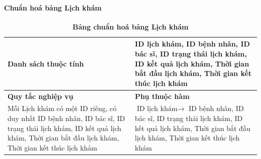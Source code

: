 \paragraph{Chuẩn hoá bảng Lịch khám}
\mbox{}
\begin{table}[H]
	\caption{\bfseries \fontsize{12pt}{0pt}\selectfont Bảng chuẩn hoá bảng Lịch khám}
	\centering
	\begin{tabularx}{0.9\textwidth}{|X|X|}
		\hline
		\textbf{Danh sách thuộc tính} & ID lịch khám, ID bệnh nhân, ID bác sĩ, ID trạng thái lịch khám, ID kết quả lịch khám, Thời gian bắt đầu lịch khám, Thời gian kết thúc lịch khám                                             \\
		\hline
		\textbf{Quy tắc nghiệp vụ}    & \textbf{Phụ thuộc hàm}                                                                                                                                                                      \\
		\hline
		Mỗi Lịch khám có một ID riêng, có duy nhất ID bệnh nhân, ID bác sĩ, ID trạng thái lịch khám, ID kết quả lịch khám, Thời gian bắt đầu lịch khám, Thời gian kết thúc lịch khám
		                              & \parbox[t]{\linewidth}{$\text{ID lịch khám} \rightarrow$ ID bệnh nhân, ID bác sĩ, ID trạng thái lịch khám, ID kết quả lịch khám, Thời gian bắt đầu lịch khám, Thời gian kết thúc lịch khám} \\
		\hline
		                                                                                                                                               \\
		                                                                                                                                                          \\
		\hline
	\end{tabularx}
\end{table}

